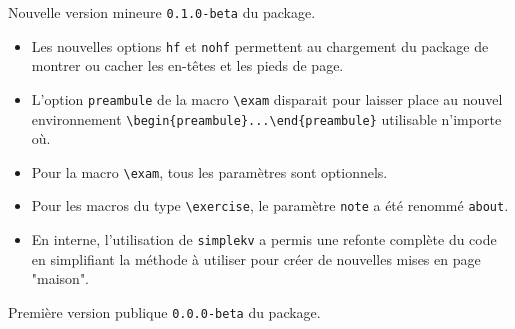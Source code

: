 \documentclass[12pt,a4paper]{scrartcl}
\theoremstyle{definition}
\begin{document}
\begin{description}[leftmargin=1em]
	\setlength\itemsep{1em}

	\item[2017-11-12] Nouvelle version mineure \verb+0.1.0-beta+ du package.
	\begin{itemize}
        \item Les nouvelles options \verb+hf+ et \verb+nohf+ permettent au chargement du package de montrer ou cacher les en-têtes et les pieds de page.

        \item L'option \verb+preambule+ de la macro \verb+\exam+ disparait pour laisser place au nouvel environnement \verb+\begin{preambule}...\end{preambule}+ utilisable n'importe où.

        \item Pour la macro \verb+\exam+, tous les paramètres sont optionnels.

        \item Pour les macros du type \verb+\exercise+, le paramètre \verb+note+ a été renommé \verb+about+.

		\item En interne, l'utilisation de \verb+simplekv+ a permis une refonte complète du code en simplifiant la méthode à utiliser pour créer de nouvelles mises en page "maison".
	\end{itemize}

	\item[2017-11-03] Première version publique \verb+0.0.0-beta+ du package.
\end{description}
\end{document}
